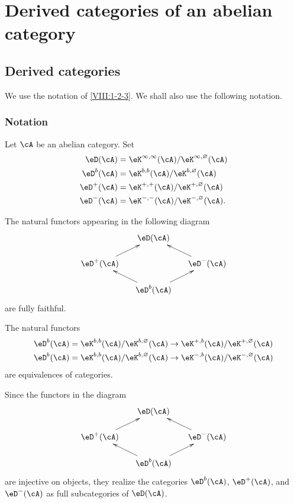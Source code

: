 \section{Derived categories of an abelian category}\label{VIII:3}

\subsection{Derived categories}\label{VIII:3-1}

We use the notation of \ref{VIII:1-2-3}. We shall also use the following
notation.

\subsubsection{Notation}\label{VIII:3-1-1}

Let $\cA$ be an abelian category. Set
\begin{align*}
  \eD(\cA) &= \eK^{\infty,\infty}(\cA)/\eK^{\infty,\varnothing}(\cA) \\
  \eD^b(\cA) &= \eK^{b,b}(\cA)/\eK^{b,\varnothing}(\cA) \\
  \eD^+(\cA) &= \eK^{+,+}(\cA) / \eK^{+,\varnothing}(\cA) \\
  \eD^-(\cA) &= \eK^{-,-}(\cA) / \eK^{-,\varnothing}(\cA) \text{.}
\end{align*}

\begin{proposition}\label{VIII:3-1-2}
The natural functors appearing in the following diagram
\[\xymatrix@=0.5cm{
  & \eD(\cA) \\
  \eD^+(\cA) \ar[ur]
    & & \eD^-(\cA) \ar[ul] \\
  & \eD^b(\cA) \ar[ul] \ar[ur]
}\]
are fully faithful.

The natural functors
\begin{align*}
  \eD^b(\cA) &= \eK^{b,b}(\cA)/\eK^{b,\varnothing}(\cA) \to \eK^{+,b}(\cA)/\eK^{+,\varnothing}(\cA) \\
  \eD^b(\cA) &= \eK^{b,b}(\cA)/\eK^{b,\varnothing}(\cA) \to \eK^{-,b}(\cA) / \eK^{-,\varnothing}(\cA)
\end{align*}
are equivalences of categories.

Since the functors in the diagram
\[\xymatrix@=0.5cm{
  & \eD(\cA) \\
  \eD^+(\cA) \ar[ur]
    & & \eD^-(\cA) \ar[ul] \\
  & \eD^b(\cA) \ar[ul] \ar[ur]
}\]
are injective on objects, they realize the categories $\eD^b(\cA)$,
$\eD^+(\cA)$, and $\eD^-(\cA)$ as full subcategories of $\eD(\cA)$.
\end{proposition}

